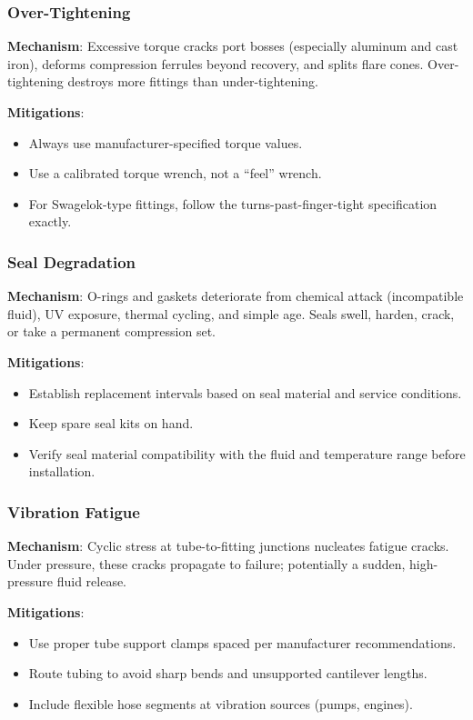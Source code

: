 \documentclass[11pt,letterpaper,twoside,openany]{book}
\begin{document}
\subsubsection{Over-Tightening}

\textbf{Mechanism}: Excessive torque cracks port bosses (especially aluminum and cast iron), deforms compression ferrules beyond recovery, and splits flare cones. Over-tightening destroys more fittings than under-tightening.

\textbf{Mitigations}:
\begin{itemize}[nosep,leftmargin=1.5em]
  \item Always use manufacturer-specified torque values.
  \item Use a calibrated torque wrench, not a ``feel'' wrench.
  \item For Swagelok-type fittings, follow the turns-past-finger-tight specification exactly.
\end{itemize}

\subsubsection{Seal Degradation}

\textbf{Mechanism}: O-rings and gaskets deteriorate from chemical attack (incompatible fluid), UV exposure, thermal cycling, and simple age. Seals swell, harden, crack, or take a permanent compression set.

\textbf{Mitigations}:
\begin{itemize}[nosep,leftmargin=1.5em]
  \item Establish replacement intervals based on seal material and service conditions.
  \item Keep spare seal kits on hand.
  \item Verify seal material compatibility with the fluid and temperature range before installation.
\end{itemize}

\subsubsection{Vibration Fatigue}

\textbf{Mechanism}: Cyclic stress at tube-to-fitting junctions nucleates fatigue cracks. Under pressure, these cracks propagate to failure; potentially a sudden, high-pressure fluid release.

\textbf{Mitigations}:
\begin{itemize}[nosep,leftmargin=1.5em]
  \item Use proper tube support clamps spaced per manufacturer recommendations.
  \item Route tubing to avoid sharp bends and unsupported cantilever lengths.
  \item Include flexible hose segments at vibration sources (pumps, engines).
\end{itemize}
\end{document}
